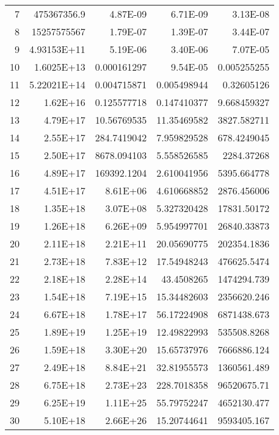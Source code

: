 \documentclass[12pt]{article}
\begin{document}
\begin{enumerate}
\begin{landscape}
\begin{table}[htbp]
\begin{tabular}{rrrrr}
      7     & 475367356.9 & 4.87E-09 & 6.71E-09 & 3.13E-08 \\
      8     & 15257575567 & 1.79E-07 & 1.39E-07 & 3.44E-07 \\
      9     & 4.93153E+11 & 5.19E-06 & 3.40E-06 & 7.07E-05 \\
      10    & 1.6025E+13 & 0.000161297 & 9.54E-05 & 0.005255255 \\
      11    & 5.22021E+14 & 0.004715871 & 0.005498944 & 0.32605126 \\
      12    & 1.62E+16 & 0.125577718 & 0.147410377 & 9.668459327 \\
      13    & 4.79E+17 & 10.56769535 & 11.35469582 & 3827.582711 \\
      14    & 2.55E+17 & 284.7419042 & 7.959829528 & 678.4249045 \\
      15    & 2.50E+17 & 8678.094103 & 5.558526585 & 2284.37268 \\
      16    & 4.89E+17 & 169392.1204 & 2.610041956 & 5395.664778 \\
      17    & 4.51E+17 & 8.61E+06 & 4.610668852 & 2876.456006 \\
      18    & 1.35E+18 & 3.07E+08 & 5.327320428 & 17831.50172 \\
      19    & 1.26E+18 & 6.26E+09 & 5.954997701 & 26840.33873 \\
      20    & 2.11E+18 & 2.21E+11 & 20.05690775 & 202354.1836 \\
      21    & 2.73E+18 & 7.83E+12 & 17.54948243 & 476625.5474 \\
      22    & 2.18E+18 & 2.28E+14 & 43.4508265 & 1474294.739 \\
      23    & 1.54E+18 & 7.19E+15 & 15.34482603 & 2356620.246 \\
      24    & 6.67E+18 & 1.78E+17 & 56.17224908 & 6871438.673 \\
      25    & 1.89E+19 & 1.25E+19 & 12.49822993 & 535508.8268 \\
      26    & 1.59E+18 & 3.30E+20 & 15.65737976 & 7666886.124 \\
      27    & 2.49E+18 & 8.84E+21 & 32.81955573 & 1360561.489 \\
      28    & 6.75E+18 & 2.73E+23 & 228.7018358 & 96520675.71 \\
      29    & 6.25E+19 & 1.11E+25 & 55.79752247 & 4652130.477 \\
      30    & 5.10E+18 & 2.66E+26 & 15.20744641 & 9593405.167 \\
      \end{tabular}%
    \label{tab:addlabel}%
  \end{table}%
  

\end{landscape}
\end{enumerate}
\end{document}
